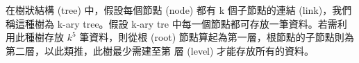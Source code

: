 \ifx\ntpcNinetyThree\undefined[93學年基北區] \fi
\label{ntpc-93-p41} 在樹狀結構 (tree) 中，假設每個節點 (node) 都有 k 個子節點的連結 (link)，我們稱這種樹為 k-ary tree。假設 k-ary tre 中每一個節點都可存放一筆資料。若需利用此種樹存放 $k^5$ 筆資料，則從根 (root) 節點算起為第一層，根節點的子節點則為第二層，以此類推，此樹最少需建至第 \underlineblank{\ref{ntpc-93-p41}} 層 (level) 才能存放所有的資料。